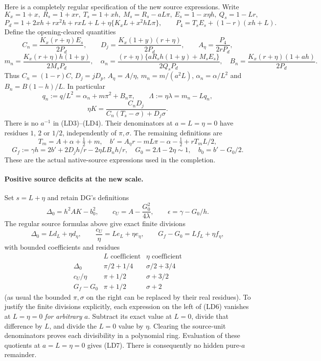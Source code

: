 Here is a completely regular specification of the new source
expressions. Write
\[
 K_x=1+x,\ R_s=1+xr,\ T_s=1+xh,\ M_s=R_s-aL\pi,
 \ E_s=1-x\eta h,\ Q_s=1-Lr,
\]
\[
 P_d=1+2xh+rx^2h+rxL+L
                  +\eta\{K_xL+x^2hL\pi\},\qquad
 P_4=T_sE_s+(1-r)(xh+L).
\]
Define the opening-cleared quantities
\[
 C_n=\frac{K_x(r+\eta)E_s}{2P_d},\qquad
 D_j=\frac{K_x(1+y)(r+\eta)}{2P_d},\qquad
 A_\eta=\frac{P_4}{2rP_d},
\]
\[
 m_n=\frac{K_x(r+\eta)h(1+y)}{2M_sP_d},\quad
 \alpha_n=\frac{(r+\eta)\{aR_sh(1+y)+M_sE_s\}}
                         {2Q_sP_d},\quad
 B_n=\frac{K_x(r+\eta)(1+ah)}{2P_d}.                 \tag{LD3}
\]
Thus $C_n=(1-r)C$, $D_j=jD_p$, $A_\eta=A/\eta$,
$m_n=m/(a^2L)$, $\alpha_n=\alpha/L^2$ and
$B_n=B(1-h)/L$. In particular
\[
 q_n:=q/L^2=\alpha_n+m\pi^2+B_n\pi,\qquad
 \Lambda:=\eta\lambda=m_n-Lq_n,
\]
\[
 \eta K=\frac{C_nD_j}
                  {C_n(T_s-\sigma)+D_j\sigma}.       \tag{LD4}
\]
There is no $a^{-1}$ in (LD3)--(LD4). Their denominators at
$a=L=\eta=0$ have residues $1$, $2$ or $1/2$, independently
of $\pi,\sigma$. The remaining definitions are
\[
 T_m=A+\alpha+\tfrac12+m,\quad
 b'=A_\eta r-mL\pi-\alpha-\tfrac12+rT_mL/2,
\]
\[
 G_f:=\gamma h=2b'+2D_jh/r-2\eta LB_nh/r,
 \quad G_0=2\Lambda-2\eta\sim1,\quad b_0=b'-G_0/2.
                                                               \tag{LD5}
\]
These are the actual native-source expressions used in the completion.

\paragraph{Positive source deficits at the new scale.}
Set $s=L+\eta$ and retain DG's definitions
\[
 \Delta_0=h^2AK-b_0^2,
 \qquad c_U=A-\frac{G_0^2}{4\lambda},
 \qquad\epsilon=\gamma-G_0/h.
\]
The regular source formulas above give exact finite divisions
\[
 \Delta_0=Ld_L+\eta d_\eta,\qquad
 \frac{c_U}{\eta}=Le_L+\eta e_\eta,\qquad
 G_f-G_0=Lf_L+\eta f_\eta,                           \tag{LD6}
\]
with bounded coefficients and residues
\[
\begin{array}{c|cc}
 &L\text{ coefficient}&\eta\text{ coefficient}\\\hline
 \Delta_0&\pi/2+1/4&\sigma/2+3/4\\
 c_U/\eta&\pi+1/2&\sigma+3/2\\
 G_f-G_0&\pi+1/2&\sigma+2
\end{array}                                                     \tag{LD7}
\]
(as usual the bounded $\pi,\sigma$ on the right can be replaced
by their real residues). To justify the finite divisions explicitly,
each expression on the left of (LD6) vanishes at $L=\eta=0$
\emph{for arbitrary $a$}. Subtract its exact value at $L=0$, divide
that difference by $L$, and divide the $L=0$ value by $\eta$.
Clearing the source-unit denominators proves each divisibility in a
polynomial ring. Evaluation of these quotients at $a=L=\eta=0$
gives (LD7). There is consequently no hidden pure-$a$ remainder.

